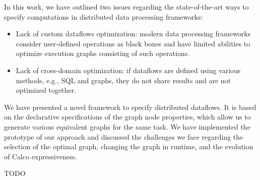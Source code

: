 In this work, we have outlined two issues regarding the state-of-the-art ways to specify computations in distributed data processing frameworks:
\begin{itemize}
    \item Lack of custom dataflows optimization: modern data processing frameworks consider user-defined operations as black boxes and have limited abilities to optimize execution graphs consisting of such operations.
    \item Lack of cross-domain optimization: if dataflows are defined using various methods, e.g., SQL and graphs, they do not share results and are not optimized together.
\end{itemize}

We have presented a novel framework to specify distributed dataflows.
It is based on the declarative specifications of the graph node properties, which allow us to generate various equivalent graphs for the same task.
We have implemented the prototype of our approach and discussed the challenges we face regarding the selection of the optimal graph, changing the graph in runtime, and the evolution of Calco expressiveness.

TODO
